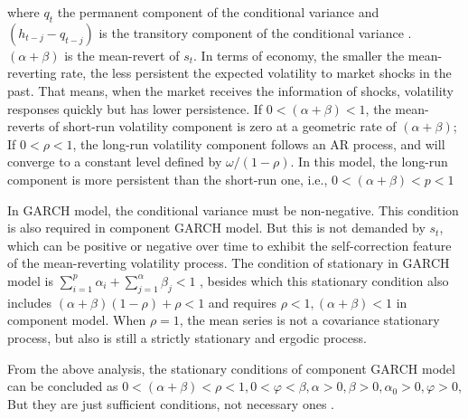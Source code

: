 where $q_{t}$ the permanent component of the conditional variance and $(h_{t-j}-q_{t-j})$ is the transitory component of the conditional variance \citep{Ghalanos2011}. $(\alpha + \beta)$ is the mean-revert of $s_{t}$. In terms of economy, the smaller the mean-reverting rate, the less persistent the expected volatility to market shocks in the past. That means, when the market receives the information of shocks, volatility responses quickly but has lower persistence. If $0<(\alpha + \beta)<1$, the mean-reverts of short-run volatility component is zero at a geometric rate of  $(\alpha + \beta)$; If $0<\rho<1$,  the long-run volatility component follows an AR process, and will converge to a constant level defined by $\omega/(1-\rho)$.  In this model, the long-run component is more persistent than the short-run one, i.e., $0<(\alpha + \beta)<p<1$

In GARCH model, the conditional variance must be non-negative. This condition is also required in component GARCH model. But this is not demanded by $s_{t}$, which can be positive or negative over time to exhibit the self-correction feature of the mean-reverting volatility process. The condition of stationary in GARCH model is  $\sum_{i=1}^{p}\alpha_{i} + \sum_{j=1}^{\alpha}\beta_{j}<1$ , besides which this stationary condition also includes $(\alpha + \beta)(1-\rho)+\rho<1$ and requires $\rho<1,(\alpha + \beta)<1$ in component model. When $\rho=1$, the mean series is not a covariance stationary process, but also is still a strictly stationary and ergodic process.

From the above analysis, the stationary conditions of component GARCH model can be concluded as $0<(\alpha + \beta)< \rho<1, 0<\varphi<\beta,\alpha>0,\beta>0,\alpha_{0}>0,\varphi>0$,  But they are just sufficient conditions, not necessary ones \cite{0-19-829683-5}.
   


